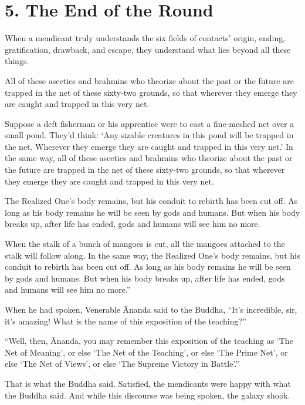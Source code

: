 \documentclass[12pt,openany]{book}%
\begin{document}
\section*{5. The End of the Round }

When a mendicant truly understands the six fields of contacts’ origin, ending, gratification, drawback, and escape, they understand what lies beyond all these things. 

All of these ascetics and brahmins who theorize about the past or the future are trapped in the net of these sixty-two grounds, so that wherever they emerge they are caught and trapped in this very net. 

Suppose a deft fisherman or his apprentice were to cast a fine-meshed net over a small pond. They’d think: ‘Any sizable creatures in this pond will be trapped in the net. Wherever they emerge they are caught and trapped in this very net.’ In the same way, all of these ascetics and brahmins who theorize about the past or the future are trapped in the net of these sixty-two grounds, so that wherever they emerge they are caught and trapped in this very net. 

The Realized One’s body remains, but his conduit to rebirth has been cut off. As long as his body remains he will be seen by gods and humans. But when his body breaks up, after life has ended, gods and humans will see him no more. 

When the stalk of a bunch of mangoes is cut, all the mangoes attached to the stalk will follow along. In the same way, the Realized One’s body remains, but his conduit to rebirth has been cut off. As long as his body remains he will be seen by gods and humans. But when his body breaks up, after life has ended, gods and humans will see him no more.” 

When he had spoken, Venerable Ānanda said to the Buddha, “It’s incredible, sir, it’s amazing! What is the name of this exposition of the teaching?” 

“Well, then, Ānanda, you may remember this exposition of the teaching as ‘The Net of Meaning’, or else ‘The Net of the Teaching’, or else ‘The Prime Net’, or else ‘The Net of Views’, or else ‘The Supreme Victory in Battle’.” 

That is what the Buddha said. Satisfied, the mendicants were happy with what the Buddha said. And while this discourse was being spoken, the galaxy shook. 
\end{document}
